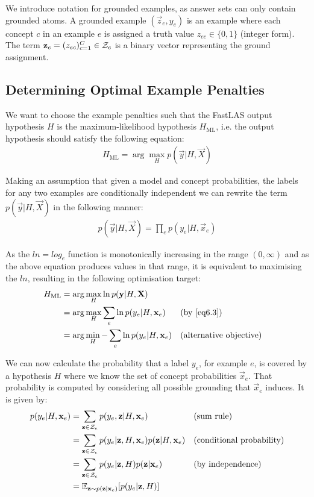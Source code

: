 We introduce notation for grounded examples, as answer sets can only contain grounded atoms.
A grounded example $(\vec{z}_e, y_e)$ is an example where each concept $c$ in an example $e$ is assigned a truth value $z_{ec} \in \{0,1\}$ (integer form). 
The term $\vec{z}_e = (z_{ec})_{c=1}^C \in \curly{Z}_e$  is a binary vector representing the ground assignment. 

\subsection{Determining Optimal Example Penalties}

We want to choose the example penalties such that the FastLAS output hypothesis $H$ is the maximum-likelihood hypothesis $H_{\text{ML}}$, i.e. the output hypothesis should satisfy the following equation:
\begin{align}
H_{\text{ML}} = \arg\max_{H}
p(\vec{y}|H, \vec{X})
\end{align}

Making an assumption that given a model and concept probabilities, the labels for any two examples are conditionally independent we can rewrite the term $p(\vec{y}|H, \vec{X})$ in the following manner:
\begin{align}
p(\vec{y}|H, \vec{X})
= \prod_{e} p(y_e|H, \vec{x}_e) \label{eq6.3}
\end{align}


As the $ln = log_e$ function is monotonically increasing in the range $(0, \infty)$ and as the above equation produces values in that range, it is equivalent to maximising the $ln$, resulting in the following optimisation target:
\begin{align}
H_{\text{ML}}
& = \arg\max_{H}
\ln p(\vec{y}|H, \vec{X}) \nonumber \\
& = \arg\max_{H}
\sum_{e} \ln p(y_e|H, \vec{x}_e) && \text{(by \ref{eq6.3})} \nonumber \\
& = \arg\min_{H}
-\sum_{e} \ln p(y_e|H, \vec{x}_e) && \text{(alternative objective)} \label{ex6.4}
\end{align}


We can now calculate the probability that a label $y_e$, for example $e$, is covered by a hypothesis $H$ where we know the set of concept probabilities $\vec{x}_e$.
That probability is computed by considering all possible grounding that $\vec{x}_e$ induces.
It is given by:
\begin{align}
p(y_e|H, \vec{x}_e)
& = \sum_{\vec{z} \in \curly{Z}_e} p(y_e, \vec{z} | H, \vec{x}_e) && \text{(sum rule)} \nonumber \\
& = \sum_{\vec{z} \in \curly{Z}_e} p(y_e | \vec{z}, H, \vec{x}_e) p(\vec{z} | H, \vec{x}_e) && \text{(conditional probability)} \nonumber \\
& = \sum_{\vec{z} \in \curly{Z}_e} p(y_e | \vec{z}, H) p(\vec{z}| \vec{x}_e) && \text{(by independence)} \nonumber \\
& = \expct_{\vec{z} \sim p(\vec{z}| \vec{x}_e)}[p(y_e|\vec{z},H)] \label{ex6.5}
\end{align}

